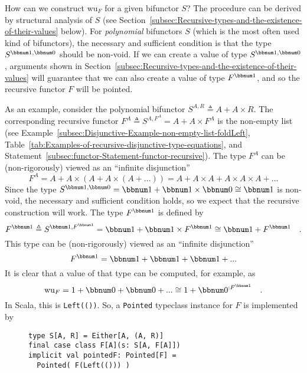 How can we construct $\text{wu}_{F}$ for a given bifunctor $S$?
The procedure can be derived by structural analysis of $S$ (see Section~\ref{subsec:Recursive-types-and-the-existence-of-their-values}
below). For \emph{polynomial} bifunctors $S$ (which is the most often
used kind of bifunctors), the necessary and sufficient condition is
that the type $S^{\bbnum 1,\bbnum 0}$ should be non-void. If we can
create a value of type $S^{\bbnum 1,\bbnum 0}$ , arguments shown
in Section~\ref{subsec:Recursive-types-and-the-existence-of-their-values}
will guarantee that we can also create a value of type $F^{\bbnum 1}$,
and so the recursive functor $F$ will be pointed.

As an example, consider the polynomial bifunctor $S^{A,R}\triangleq A+A\times R$.
The corresponding recursive functor $F^{A}\triangleq S^{A,F^{A}}=A+A\times F^{A}$
is the non-empty list (see Example~\ref{subsec:Disjunctive-Example-non-empty-list-foldLeft},
Table~\ref{tab:Examples-of-recursive-disjunctive-type-equations},
and Statement~\ref{subsec:functor-Statement-functor-recursive}).
The type $F^{A}$ can be (non-rigorously) viewed as an ``infinite
disjunction''
\[
F^{A}=A+A\times(A+A\times\left(A+...\right))=A+A\times A+A\times A\times A+...
\]
Since the type $S^{\bbnum 1,\bbnum 0}=\bbnum 1+\bbnum 1\times\bbnum 0\cong\bbnum 1$
is non-void, the necessary and sufficient condition holds, so we expect
that the recursive construction will work. The type $F^{\bbnum 1}$
is defined by 
\[
F^{\bbnum 1}\triangleq S^{\bbnum 1,F^{\bbnum 1}}=\bbnum 1+\bbnum 1\times F^{\bbnum 1}\cong\bbnum 1+F^{\bbnum 1}\quad.
\]
This type can be (non-rigorously) viewed as an ``infinite disjunction''
\[
F^{\bbnum 1}=\bbnum 1+\bbnum 1+\bbnum 1+...
\]
It is clear that a value of that type can be computed, for example,
as 
\[
\text{wu}_{F}=1+\bbnum 0+\bbnum 0+...\cong1+\bbnum 0^{:F^{\bbnum 1}}\quad.
\]
In Scala, this is \lstinline!Left(())!. So, a \lstinline!Pointed!
typeclass instance for $F$ is implemented by

\begin{wrapfigure}{l}{0.42\columnwidth}%
\vspace{-0.8\baselineskip}
\begin{lstlisting}
type S[A, R] = Either[A, (A, R)]
final case class F[A](s: S[A, F[A]])
implicit val pointedF: Pointed[F] =
  Pointed( F(Left(())) )
\end{lstlisting}
\vspace{-0.5\baselineskip}
\end{wrapfigure}%

